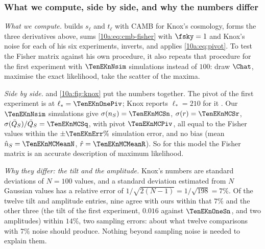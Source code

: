 \subsubsection*{What we compute, side by side, and why the numbers differ}

\emph{What we compute.}  builds $s_\ell$ and $t_\ell$ with CAMB for Knox's cosmology, forms the
three derivatives above, sums \eqref{10a:eq:cmb-fisher} with $\fsky=1$ and Knox's noise for each of his six experiments,
inverts, and applies \eqref{10a:eq:pivot}. To test the Fisher matrix against his own procedure, it also repeats
that procedure for the first experiment with $\TenEKnNsim$ simulations instead of $100$: draw $\Chat$, maximise the
exact likelihood, take the scatter of the maxima.

\emph{Side by side.}  and \cref{10a:fig:knox} put the numbers together. The pivot of the first
experiment is at $\ell_*=\TenEKnOnePiv$; Knox reports $\ell_*=210$ for it . Our $\TenEKnNsim$ simulations give
$\sigma(n_S)=\TenEKnMCSn$, $\sigma(r)=\TenEKnMCSr$, $\sigma(\bar Q_S)/\bar Q_S=\TenEKnMCSq$, with pivot $\TenEKnMCPiv$, all equal to the Fisher
values within the $\pm\TenEKnErr\%$ simulation error, and no bias (mean $\hat n_S=\TenEKnMCMeanN$, $\hat r=\TenEKnMCMeanR$). So for this
model the Fisher matrix is an accurate description of maximum likelihood.

\emph{Why they differ: the tilt and the amplitude.} Knox's numbers are standard deviations of $N=100$ values, and
a standard deviation estimated from $N$ Gaussian values has a relative error of $1/\sqrt{2(N-1)}=1/\sqrt{198}=7\%$. Of
the twelve tilt and amplitude entries, nine agree with ours within that $7\%$ and the other three (the tilt of the
first experiment, $0.016$ against $\TenEKnOneSn$, and two amplitudes) within $14\%$, two sampling errors: about what
twelve comparisons with $7\%$ noise should produce. Nothing beyond sampling noise is needed to explain them.

